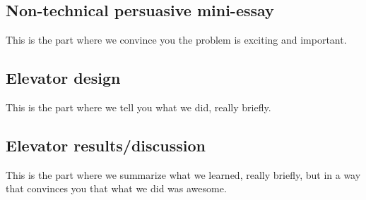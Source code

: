 \subsection{Non-technical persuasive mini-essay}
This is the part where we convince you the problem is exciting and important.

\subsection{Elevator design}
This is the part where we tell you what we did, really briefly.

\subsection{Elevator results/discussion}
This is the part where we summarize what we learned, really briefly, but
in a way that convinces you that what we did was awesome.

